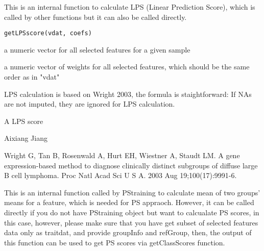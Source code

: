 \documentclass[letterpaper]{book}
\begin{document}
%
\begin{Description}\relax
This is an internal function to calculate LPS (Linear Prediction Score),
which is called by other functions but it can also be called directly.
\end{Description}
%
\begin{Usage}
\begin{verbatim}
getLPSscore(vdat, coefs)
\end{verbatim}
\end{Usage}
%
\begin{Arguments}
\begin{ldescription}
\item[\code{vdat}] a numeric vector for all selected features for a given sample

\item[\code{coefs}] a numeric vector of weights for all selected features, 
which should be the same order as in "vdat"
\end{ldescription}
\end{Arguments}
%
\begin{Details}\relax
LPS calculation is based on Wright 2003, the formula is staightforward:
If NAs are not imputed, they are ignored for LPS calculation.
\end{Details}
%
\begin{Value}
A LPS score
\end{Value}
%
\begin{Author}\relax
Aixiang Jiang
\end{Author}
%
\begin{References}\relax
Wright G, Tan B, Rosenwald A, Hurt EH, Wiestner A, Staudt LM. A gene expression-based method
to diagnose clinically distinct subgroups of diffuse large B cell lymphoma. Proc Natl Acad Sci U S
A. 2003 Aug 19;100(17):9991-6.
\end{References}
%
\begin{Description}\relax
This is an internal function called by PStraining to calculate mean of two groups' means for a feature,
which is needed for PS appraoch. However, it can be called directly if you do not have PStraining object but want to calcualate
PS scores, in this case, however, please make sure that you have get subset of selected features data only as traitdat, and
provide groupInfo and refGroup, then, the output of this function can be used to get PS scores via getClassScores function.
\end{Description}
\end{document}
